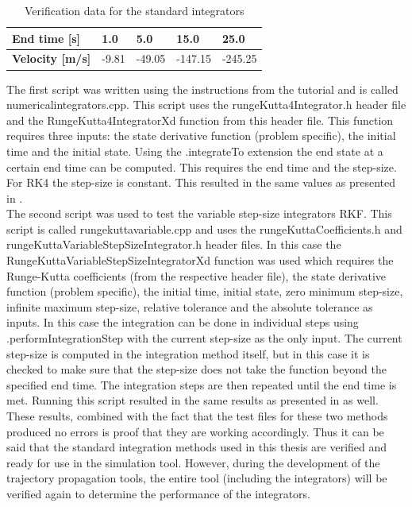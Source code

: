 \begin{table}[H]
\begin{center}
\caption{Verification data for the standard integrators}
\label{tab:intverdat}
\begin{tabular}{|l|l|l|l|l|}
\hline 
\textbf{End time [s]} & 1.0	& 5.0 & 15.0 & 25.0 \\ \hline 
\textbf{Velocity [m/s]} & -9.81 & -49.05 & -147.15 & -245.25 \\ \hline
\end{tabular}
\end{center}
\end{table}

The first script was written using the instructions from the tutorial and is called numericalintegrators.cpp. This script uses the rungeKutta4Integrator.h header file and the RungeKutta4IntegratorXd function from this header file. This function requires three inputs: the state derivative function (problem specific), the initial time and the initial state. Using the .integrateTo extension the end state at a certain end time can be computed. This requires the end time and the step-size. For \ac{RK4} the step-size is constant. This resulted in the same values as presented in .\\

The second script was used to test the variable step-size integrators \ac{RKF}. This script is called rungekuttavariable.cpp and uses the rungeKuttaCoefficients.h and rungeKuttaVariableStepSizeIntegrator.h header files. In this case the RungeKuttaVariableStepSizeIntegratorXd function was used which requires the Runge-Kutta coefficients (from the respective header file), the state derivative function (problem specific), the initial time, initial state, zero minimum step-size, infinite maximum step-size, relative tolerance and the absolute tolerance as inputs. In this case the integration can be done in individual steps using .performIntegrationStep with the current step-size as the only input. The current step-size is computed in the integration method itself, but in this case it is checked to make sure that the step-size does not take the function beyond the specified end time. The integration steps are then repeated until the end time is met. Running this script resulted in the same results as presented in  as well. \\

These results, combined with the fact that the test files for these two methods produced no errors is proof that they are working accordingly. Thus it can be said that the standard integration methods used in this thesis are verified and ready for use in the simulation tool. However, during the development of the trajectory propagation tools, the entire tool (including the integrators) will be verified again to determine the performance of the integrators.


